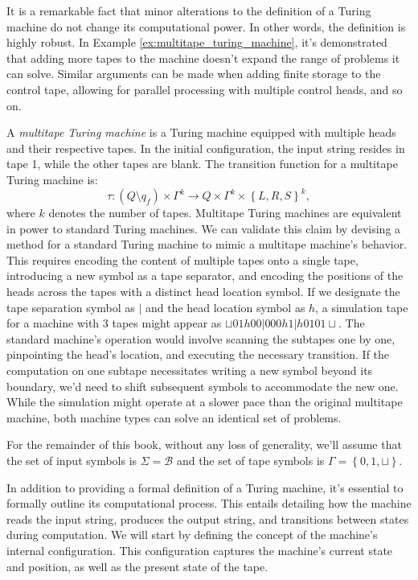 It is a remarkable fact that minor alterations to the definition of a Turing machine do not change its computational power. In other words, the definition is highly robust. In Example \ref{ex:multitape_turing_machine}, it's demonstrated that adding more tapes to the machine doesn't expand the range of problems it can solve. Similar arguments can be made when adding finite storage to the control tape, allowing for parallel processing with multiple control heads, and so on.

\begin{example}
\label{ex:multitape_turing_machine}
A \emph{multitape Turing machine} is a Turing machine equipped with multiple heads and their respective tapes. In the initial configuration, the input string resides in tape 1, while the other tapes are blank. The transition function for a multitape Turing machine is:
\[
\tau:\left(Q \setminus q_{f} \right) \times \Gamma^k \rightarrow  Q \times \Gamma^k \times \left\{L,R,S\right\}^k,
\]
where $k$ denotes the number of tapes. Multitape Turing machines are equivalent in power to standard Turing machines. We can validate this claim by devising a method for a standard Turing machine to mimic a multitape machine's behavior. This requires encoding the content of multiple tapes onto a single tape, introducing a new symbol as a tape separator, and encoding the positions of the heads across the tapes with a distinct head location symbol. If we designate the tape separation symbol as $|$ and the head location symbol as $h$, a simulation tape for a machine with 3 tapes might appear as $\sqcup01h00|000h1|h0101\sqcup$. The standard machine's operation would involve scanning the subtapes one by one, pinpointing the head's location, and executing the necessary transition. If the computation on one subtape necessitates writing a new symbol beyond its boundary, we'd need to shift subsequent symbols to accommodate the new one. While the simulation might operate at a slower pace than the original multitape machine, both machine types can solve an identical set of problems.
\end{example}

For the remainder of this book, without any loss of generality, we'll assume that the set of input symbols is $\Sigma = \mathcal{B}$ and the set of tape symbols is $\Gamma = \left\{0, 1, \sqcup \right\}$.

In addition to providing a formal definition of a Turing machine, it's essential to formally outline its computational process. This entails detailing how the machine reads the input string, produces the output string, and transitions between states during computation. We will start by defining the concept of the machine's internal configuration. This configuration captures the machine's current state and position, as well as the present state of the tape.

